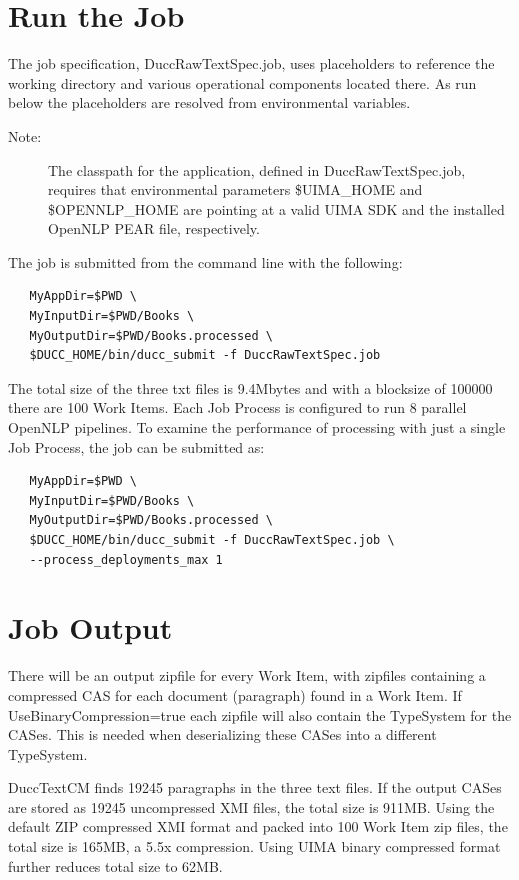 \section{Run the Job}
The job specification, DuccRawTextSpec.job, uses placeholders to reference the working directory
and various operational components located there. As run below the placeholders are resolved
from environmental variables.

	\begin{description}
    \item[Note:] The classpath for the application, defined in DuccRawTextSpec.job, requires that environmental parameters 
    \$UIMA\_HOME and \$OPENNLP\_HOME are pointing at a valid UIMA SDK and the installed OpenNLP PEAR file, respectively. 
	\end{description}

The job is submitted from the command line with the following:
\begin{verbatim}
   MyAppDir=$PWD \
   MyInputDir=$PWD/Books \
   MyOutputDir=$PWD/Books.processed \
   $DUCC_HOME/bin/ducc_submit -f DuccRawTextSpec.job
\end{verbatim}

The total size of the three txt files is 9.4Mbytes and with a blocksize of 100000 there are 100 Work Items. Each Job Process is 
configured to run 8 parallel OpenNLP pipelines. To examine the performance of processing with just a single Job Process, 
the job can be submitted as:

\begin{verbatim}
   MyAppDir=$PWD \
   MyInputDir=$PWD/Books \
   MyOutputDir=$PWD/Books.processed \
   $DUCC_HOME/bin/ducc_submit -f DuccRawTextSpec.job \
   --process_deployments_max 1
\end{verbatim}

\section{Job Output}
There will be an output zipfile for every Work Item, with zipfiles containing a compressed CAS for each document (paragraph) 
found in a Work Item. If UseBinaryCompression=true each zipfile will also contain the TypeSystem for the CASes. 
This is needed when deserializing these CASes into a different TypeSystem.

DuccTextCM finds 19245 paragraphs in the three text files. If the output CASes are stored as 19245 uncompressed XMI files, the total size is 911MB. Using the default ZIP compressed XMI format and packed into 100 Work Item zip files, the total size is 165MB, a 5.5x compression. Using UIMA binary compressed format further reduces total size to 62MB.

